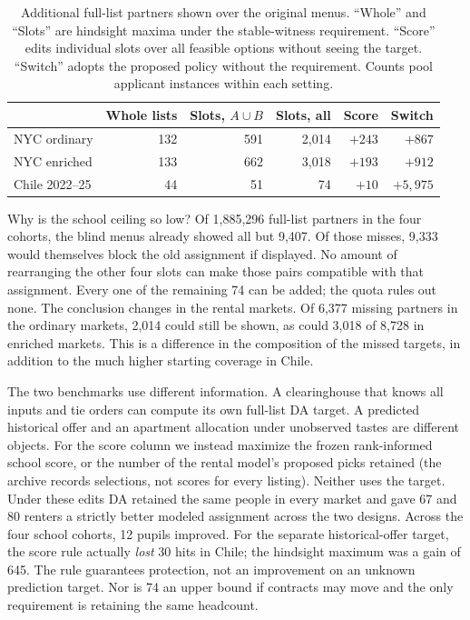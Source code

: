 \begin{table}[ht]\centering\small
\caption{Additional full-list partners shown over the original menus. ``Whole'' and ``Slots'' are hindsight maxima under the stable-witness requirement. ``Score'' edits individual slots over all feasible options without seeing the target. ``Switch'' adopts the proposed policy without the requirement. Counts pool applicant instances within each setting.}\label{tab:slotrepair}
\begin{tabular}{@{}lrrrrr@{}}\toprule
 & Whole lists & Slots, $A\cup B$ & Slots, all & Score & Switch\\\midrule
NYC ordinary & 132 & 591 & 2,014 & $+243$ & $+867$\\
NYC enriched & 133 & 662 & 3,018 & $+193$ & $+912$\\
Chile 2022--25 & 44 & 51 & 74 & $+10$ & $+5,975$\\\bottomrule
\end{tabular}
\end{table}

Why is the school ceiling so low? Of 1,885,296 full-list partners in the four cohorts, the blind menus already showed all but 9,407. Of those misses, 9,333 would themselves block the old assignment if displayed. No amount of rearranging the other four slots can make those pairs compatible with that assignment. Every one of the remaining 74 can be added; the quota rules out none. The conclusion changes in the rental markets. Of 6,377 missing partners in the ordinary markets, 2,014 could still be shown, as could 3,018 of 8,728 in enriched markets. This is a difference in the composition of the missed targets, in addition to the much higher starting coverage in Chile.

The two benchmarks use different information. A clearinghouse that knows all inputs and tie orders can compute its own full-list DA target. A predicted historical offer and an apartment allocation under unobserved tastes are different objects. For the score column we instead maximize the frozen rank-informed school score, or the number of the rental model's proposed picks retained (the archive records selections, not scores for every listing). Neither uses the target. Under these edits DA retained the same people in every market and gave 67 and 80 renters a strictly better modeled assignment across the two designs. Across the four school cohorts, 12 pupils improved. For the separate historical-offer target, the score rule actually \emph{lost} 30 hits in Chile; the hindsight maximum was a gain of 645. The rule guarantees protection, not an improvement on an unknown prediction target. Nor is 74 an upper bound if contracts may move and the only requirement is retaining the same headcount.

